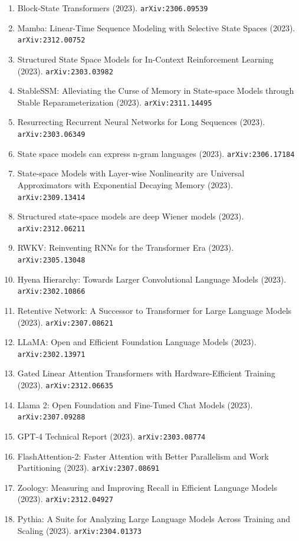 \documentclass[11pt]{article}
\begin{document}
\begin{enumerate}
  \item Block-State Transformers (2023). \texttt{arXiv:2306.09539}
  \item Mamba: Linear-Time Sequence Modeling with Selective State Spaces (2023). \texttt{arXiv:2312.00752}
  \item Structured State Space Models for In-Context Reinforcement Learning (2023). \texttt{arXiv:2303.03982}
  \item StableSSM: Alleviating the Curse of Memory in State-space Models through
  Stable Reparameterization (2023). \texttt{arXiv:2311.14495}
  \item Resurrecting Recurrent Neural Networks for Long Sequences (2023). \texttt{arXiv:2303.06349}
  \item State space models can express n-gram languages (2023). \texttt{arXiv:2306.17184}
  \item State-space Models with Layer-wise Nonlinearity are Universal
  Approximators with Exponential Decaying Memory (2023). \texttt{arXiv:2309.13414}
  \item Structured state-space models are deep Wiener models (2023). \texttt{arXiv:2312.06211}
  \item RWKV: Reinventing RNNs for the Transformer Era (2023). \texttt{arXiv:2305.13048}
  \item Hyena Hierarchy: Towards Larger Convolutional Language Models (2023). \texttt{arXiv:2302.10866}
  \item Retentive Network: A Successor to Transformer for Large Language Models (2023). \texttt{arXiv:2307.08621}
  \item LLaMA: Open and Efficient Foundation Language Models (2023). \texttt{arXiv:2302.13971}
  \item Gated Linear Attention Transformers with Hardware-Efficient Training (2023). \texttt{arXiv:2312.06635}
  \item Llama 2: Open Foundation and Fine-Tuned Chat Models (2023). \texttt{arXiv:2307.09288}
  \item GPT-4 Technical Report (2023). \texttt{arXiv:2303.08774}
  \item FlashAttention-2: Faster Attention with Better Parallelism and Work
  Partitioning (2023). \texttt{arXiv:2307.08691}
  \item Zoology: Measuring and Improving Recall in Efficient Language Models (2023). \texttt{arXiv:2312.04927}
  \item Pythia: A Suite for Analyzing Large Language Models Across Training and
  Scaling (2023). \texttt{arXiv:2304.01373}

\end{enumerate}
\end{document}
